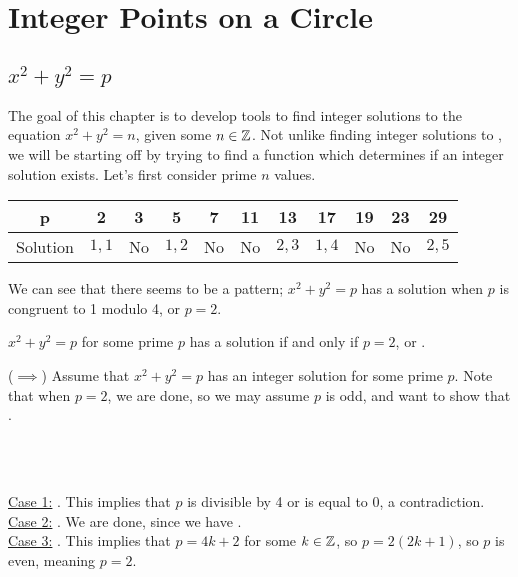 \documentclass[../main.tex]{subfiles}
\begin{document}
\chapter{Integer Points on a Circle}
\section{$x^2+y^2=p$}
The goal of this chapter is to develop tools to find integer solutions to the equation $x^2+y^2=n$, given some $n \in \mathbb{Z}$. Not unlike finding integer solutions to , we will be starting off by trying to find a function which determines if an integer solution exists. Let's first consider prime $n$ values.

\begin{center}
    \begin{tabular}{ c|c c c c c c c c c c } 
        p & 2 & 3 & 5 & 7 & 11 & 13 & 17 & 19 & 23 & 29 \\
        \hline
        Solution & $1,1$ & No & $1,2$ & No & No & $2,3$ & $1,4$ & No & No & $2,5$ \\ 
    \end{tabular}
\end{center}
We can see that there seems to be a pattern; $x^2+y^2=p$ has a solution when $p$ is congruent to 1 modulo 4, or $p=2$.
\begin{thm}
    $x^2+y^2=p$ for some prime $p$ has a solution if and only if $p=2$, or .
\end{thm}
\begin{pf}
    ($\implies$)
    Assume that $x^2+y^2=p$ has an integer solution for some prime $p$. Note that when $p=2$, we are done, so we may assume $p$ is odd, and want to show that .
    \begin{center}
         \\
         \\
    \end{center}
    \underline{Case 1:} . This implies that $p$ is divisible by 4 or is equal to 0, a contradiction. \\
    \underline{Case 2:} . We are done, since we have . \\
    \underline{Case 3:} . This implies that $p=4k + 2$ for some $k \in \mathbb{Z}$, so $p=2(2k+1)$, so $p$ is even, meaning $p=2$.
\end{pf}
\end{document}
